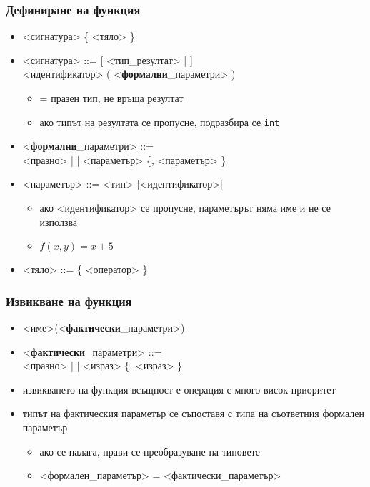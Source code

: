 \documentclass{beamer}
\begin{document}
\begin{frame}
  \frametitle{Дефиниране на функция}

  \begin{itemize}[<+->]
  \item{} <сигнатура> \tta\{ <тяло> \tta\}
  \item{} <сигнатура> ::= [ <тип\_резултат> |  ]\\
    <идентификатор> \tta( <\textbf{формални}\_параметри> \tta)
    \begin{itemize}
    \item {} = празен тип, не връща резултат
    \item ако типът на резултата се пропусне, подразбира се \tt{int}
    \end{itemize}
  \item{} <\textbf{формални}\_параметри> ::=  \\
    <празно> |  | <параметър> \{\tta, <параметър> \}
  \item{} <параметър> ::= <тип> [<идентификатор>]
    \begin{itemize}
    \item ако <идентификатор> се пропусне, параметърът няма име и не се използва
    \item \exa $f(x,y) = x + 5$
    \end{itemize}
  \item{} <тяло> ::= \tta\{ <оператор> \tta\}
  \end{itemize}
\end{frame}

\begin{frame}
  \frametitle{Извикване на функция}

  \begin{itemize}[<+->]
  \item{} <име>\tta(<\textbf{фактически}\_параметри>\tta)
  \item{} <\textbf{фактически}\_параметри> ::= \\
    <празно> |  | <израз> \{\tta, <израз> \}
  \item извикването на функция всъщност е \alert{операция} с много висок приоритет
  \item типът на фактическия параметър се съпоставя с типа на съответния формален параметър
    \begin{itemize}
    \item ако се налага, прави се преобразуване на типовете
    \item{} <формален\_параметър> = <фактически\_параметър>
    \end{itemize}
  \end{itemize}
\end{frame}
\end{document}
